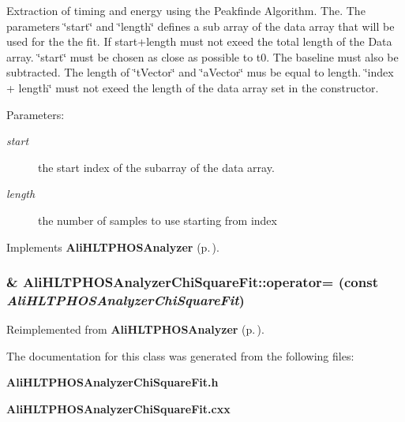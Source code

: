 Extraction of timing and energy using the Peakfinde Algorithm. The. The parameters \char`\"{}start\char`\"{} and \char`\"{}length\char`\"{} defines a sub array of the data array that will be used for the the fit. If start+length must not exeed the total length of the Data array. \char`\"{}start\char`\"{} must be chosen as close as possible to t0. The baseline must also be subtracted. The length of \char`\"{}t\-Vector\char`\"{} and \char`\"{}a\-Vector\char`\"{} mus be equal to length. \char`\"{}index + length\char`\"{} must not exeed the length of the data array set in the constructor. \begin{Desc}
\item[Parameters:]
\begin{description}
\item[{\em start}]the start index of the subarray of the data array. \item[{\em length}]the number of samples to use starting from index \end{description}
\end{Desc}


Implements {\bf Ali\-HLTPHOSAnalyzer} {\rm (p.\,\pageref{classAliHLTPHOSAnalyzer_a14})}.
\subsubsection{\& Ali\-HLTPHOSAnalyzer\-Chi\-Square\-Fit::operator= (const  {\em Ali\-HLTPHOSAnalyzer\-Chi\-Square\-Fit})\hspace{0.3cm}{\tt  [inline]}}\label{classAliHLTPHOSAnalyzerChiSquareFit_a2}




Reimplemented from {\bf Ali\-HLTPHOSAnalyzer} {\rm (p.\,\pageref{classAliHLTPHOSAnalyzer_a4})}.

The documentation for this class was generated from the following files:\begin{CompactItemize}
\item 
{\bf Ali\-HLTPHOSAnalyzer\-Chi\-Square\-Fit.h}\item 
{\bf Ali\-HLTPHOSAnalyzer\-Chi\-Square\-Fit.cxx}\end{CompactItemize}
